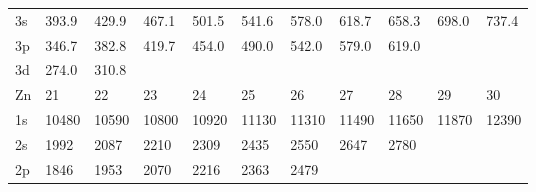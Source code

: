 \begin{table}
\begin{center}
\begin{tabular}{lllllllllll}
3s& 393.9& 429.9& 467.1& 501.5&
541.6& 578.0& 618.7& 658.3& 698.0& 737.4\\
3p& 346.7& 382.8& 419.7& 454.0& 490.0& 542.0&
579.0& 619.0\\
3d& 274.0& 310.8\\
\hline
Zn& 21& 22&  23&  24&  25&  26&  27&  28&  29&  30\\
\hline
1s& 10480&
10590& 10800& 10920& 11130& 11310& 11490& 11650& 11870& 12390\\
2s&  1992&  2087&  2210&
2309&  2435&  2550&  2647&  2780\\
2p&  1846&  1953&  2070&  2216&  2363&
2479\\
\hline
\end{tabular}
\end{center}
\end{table}
